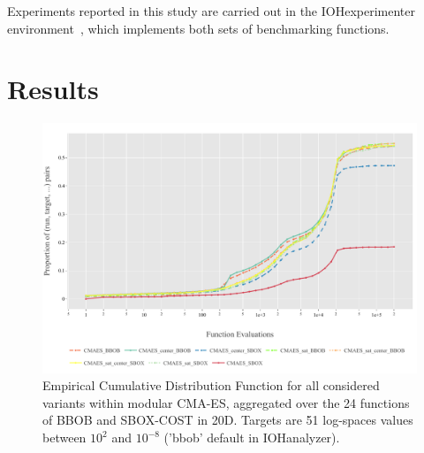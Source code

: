 \documentclass[sigconf=true, nonacm=false, review=true, anonymous = false,screen=true]{acmart}
\begin{document}
Experiments reported in this study are carried out in the IOHex\-pe\-ri\-men\-ter environment~\cite{de2021iohexperimenter}, which implements both sets of benchmarking functions. 

\section{Results}
\begin{figure}[!tb]
 \centering
 \includegraphics[width=.95\linewidth,trim=1mm 5mm 13mm 9mm,clip]{Figures/ECDF_20D_CMAESS.pdf}
 \caption{Empirical Cumulative Distribution Function for all considered variants within modular CMA-ES, aggregated over the 24 functions of BBOB and SBOX-COST in 20D. Targets are 51 log-spaces values between $10^2$ and $10^{-8}$ ('bbob' default in IOHanalyzer).}\label{fig:res_ecdf2}
\end{figure}
\end{document}
